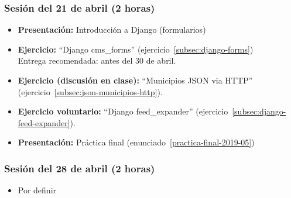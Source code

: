 \documentclass[a4paper,12pt]{article}
\begin{document}
\subsubsection{Sesión del 21 de abril (2 horas)}

\begin{itemize}
  \item \textbf{Presentación:} Introducción a Django (formularios)
  \item \textbf{Ejercicio:} ``Django cms\_forms'' (ejercicio~\ref{subsec:django-forms}) \\
  Entrega recomendada: antes del 30 de abril.
  \item \textbf{Ejercicio (discusión en clase):} ``Municipios JSON via HTTP'' (ejercicio~\ref{subsec:json-municipios-http}).
  \item \textbf{Ejercicio voluntario:} ``Django feed\_expander'' (ejercicio~\ref{subsec:django-feed-expander}).
  \item \textbf{Presentación:} Práctica final (enunciado~\ref{practica-final-2019-05})
\end{itemize}

\subsubsection{Sesión del 28 de abril (2 horas)}

\begin{itemize}
\item Por definir
\end{itemize}


\end{document}
